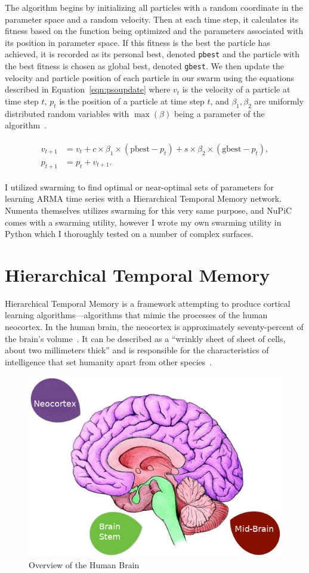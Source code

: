 \documentclass[oneside,12pt,openany]{book}
\begin{document}
	The algorithm begins by initializing all particles with a random coordinate in the parameter space and a random velocity. Then at each time step, it calculates its fitness based on the function being optimized and the parameters associated with its position in parameter space. If this fitness is the best the particle has achieved, it is recorded as its personal best, denoted \texttt{pbest} and the particle with the best fitness is chosen as global best, denoted \texttt{gbest}. We then update the velocity and particle position of each particle in our swarm using the equations described in Equation~\eqref{eqn:psoupdate} where $v_{t}$ is the velocity of a particle at time step $t$, $p_{t}$ is the position of a particle at time step $t$, and $\beta_{1}, \beta_{2}$ are uniformly distributed random variables with $\max(\beta)$ being a parameter of the algorithm~\cite{PSOReview}.
	
	\begin{align}
	\label{eqn:psoupdate}
	\begin{split}
	v_{t+1} &= v_{t}+c\times \beta_{1} \times (\text{pbest}-p_{t})+s\times \beta_{2} \times (\text{gbest}-p_{t}), \\
	p_{t+1} &= p_{t} + v_{t+1} .
	\end{split}
	\end{align}
	
	I utilized swarming to find optimal or near-optimal sets of parameters for learning ARMA time series with a Hierarchical Temporal Memory network. Numenta themselves utilizes swarming for this very same purpose, and NuPiC comes with a swarming utility, however I wrote my own swarming utility in Python which I thoroughly tested on a number of complex surfaces.
	
	\section{Hierarchical Temporal Memory}
	
	Hierarchical Temporal Memory is a framework attempting to produce cortical learning algorithms---algorithms that mimic the processes of the human neocortex. In the human brain, the neocortex is approximately seventy-percent of the brain's volume~\cite{DiscoveriesBrainWorks}. It can be described as a ``wrinkly sheet of sheet of cells, about two millimeters thick'' and is responsible for the characteristics of intelligence that set humanity apart from other species~\cite{DiscoveriesBrainWorks}. 
	
	\begin{figure}[!ht]
		\centering
		\includegraphics[width=.5\linewidth]{images/Brain.png}
		\caption{Overview of the Human Brain}
		\label{fig:brain}
	\end{figure}
	
\end{document}
